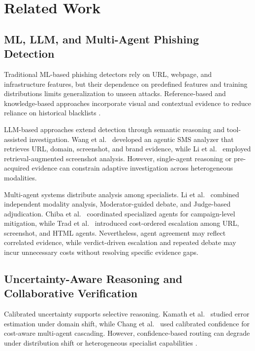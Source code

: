 
\section{Related Work}
\label{sec:related}

\subsection{ML, LLM, and Multi-Agent Phishing Detection}

Traditional ML-based phishing detectors rely on
URL, webpage, and infrastructure features, but
their dependence on predefined features and
training distributions limits generalization
to unseen attacks. Reference-based and
knowledge-based approaches incorporate visual
and contextual evidence to reduce reliance on
historical blacklists
\cite{lin2021phishpedia,liu2023knowledge}.

LLM-based approaches extend detection through
semantic reasoning and tool-assisted investigation.
Wang et al.~\cite{wang2025can} developed an
agentic SMS analyzer that retrieves URL,
domain, screenshot, and brand evidence,
while Li et al.~\cite{li2026phishintentionllm}
employed retrieval-augmented screenshot analysis.
However, single-agent reasoning or pre-acquired
evidence can constrain adaptive investigation
across heterogeneous modalities.

Multi-agent systems distribute analysis among
specialists. Li et al.~\cite{li2025phishdebate}
combined independent modality analysis,
Moderator-guided debate, and Judge-based
adjudication. Chiba et al.~\cite{chiba2026phishlumos}
coordinated specialized agents for campaign-level
mitigation, while Trad et al.~\cite{trad2025clasp}
introduced cost-ordered escalation among URL,
screenshot, and HTML agents. Nevertheless,
agent agreement may reflect correlated evidence,
while verdict-driven escalation and repeated
debate may incur unnecessary costs without
resolving specific evidence gaps.

\subsection{Uncertainty-Aware Reasoning and
Collaborative Verification}

Calibrated uncertainty supports selective
reasoning. Kamath et al.~\cite{kamath2020selective}
studied error estimation under domain shift,
while Chang et al.~\cite{chang2026cascadedebate}
used calibrated confidence for cost-aware
multi-agent cascading. However, confidence-based
routing can degrade under distribution shift
or heterogeneous specialist capabilities
\cite{jitkrittum2023when,ovadia2019can}.

